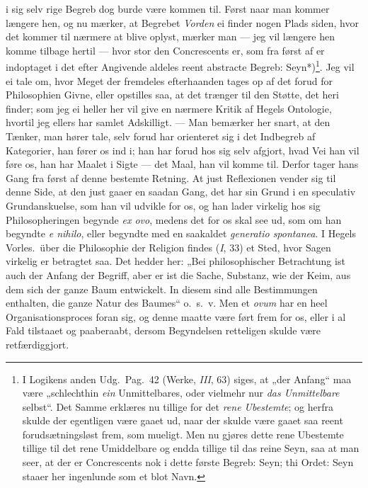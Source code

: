 \documentclass[12pt,a4paper]{book}
\newcommand{\apage}[1]{\marginnote{\footnotesize\textit{[#1]}}}
\begin{document}
i sig selv rige \apage{37} Begreb dog burde være kommen til. Først naar man
kommer længere hen, og nu mærker, at Begrebet \emph{Vorden} ei finder nogen
Plads siden, hvor det kommer til nærmere at blive oplyst, mærker man
--- jeg vil længere hen komme tilbage hertil --- hvor stor den
Concrescents er, som fra først af er indoptaget i det efter Angivende
aldeles reent abstracte Begreb: Seyn*)\footnote{I Logikens anden Udg.\
Pag.\ 42 (Werke, \textit{III}, 63) siges, at „der Anfang“ maa være
„schlechthin \emph{ein} Unmittelbares, oder vielmehr nur \emph{das Unmittelbare}
selbst“. Det Samme erklæres nu tillige for det \emph{rene Ubestemte}; og
herfra skulde der egentligen være gaaet ud, naar der skulde være gaaet
saa reent forudsætningsløst frem, som mueligt. Men nu gjøres dette
rene Ubestemte tillige til det rene Umiddelbare og endda tillige til
das reine Seyn, saa at man seer, at der er Concrescents nok i dette
første Begreb: Seyn; thi Ordet: Seyn staaer her ingenlunde som et blot
Navn.}. Jeg vil ei tale om, hvor Meget der fremdeles efterhaanden
tages op af det forud for Philosophien Givne, eller opstilles saa, at
det trænger til den Støtte, det heri finder; som jeg ei heller her vil
give en nærmere Kritik af Hegels Ontologie, hvortil jeg ellers har
samlet Adskilligt. --- Man bemærker her snart, at den Tænker, man
hører tale, selv forud har orienteret sig i det Indbegreb af
Kategorier, han fører os ind i; han har forud hos sig selv afgjort,
hvad Vei han vil føre os, han har Maalet i Sigte --- det Maal, han vil
komme til. Derfor tager hans Gang fra først af denne bestemte Retning.
At just Reflexionen vender sig til denne Side, at den just gaaer en
saadan Gang, det har sin Grund i en speculativ Grundanskuelse, som han
vil udvikle for os, og han lader virkelig hos sig Philosopheringen
begynde \textit{ex ovo}, medens det for os skal see ud, som om han
begyndte \textit{e nihilo}, eller begyndte med en saakaldet
\textit{generatio spontanea}. I Hegels Vorles.\ über die Philosophie
der Religion findes (\textit{I}, 33) et Sted, hvor Sagen virkelig er betragtet
saa. Det hedder her: „Bei philosophischer Betrachtung ist auch der
Anfang der Begriff, \apage{38} aber er ist die Sache, Substanz, wie der Keim, aus
dem sich der ganze Baum entwickelt. In diesem sind alle Bestimmungen
enthalten, die ganze Natur des Baumes“ o.\ s.\ v. Men et \textit{ovum}
har en heel Organisationsproces foran sig, og denne maatte være ført
frem for os, eller i al Fald tilstaaet og paaberaabt, dersom
Begyndelsen retteligen skulde være retfærdiggjort.
\end{document}
